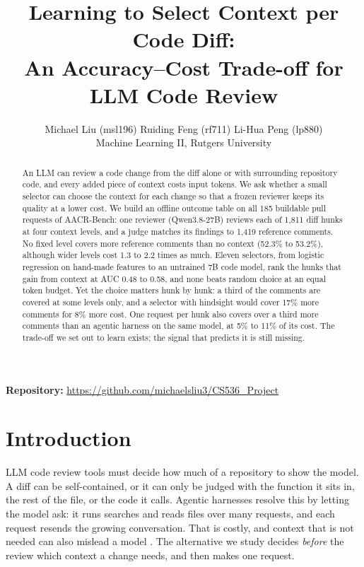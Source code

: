 \documentclass{article}
\title{Learning to Select Context per Code Diff:\\An Accuracy--Cost Trade-off for LLM Code Review}
\author{Michael Liu (msl196) \quad Ruiding Feng (rf711) \quad Li-Hua Peng (lp880)\\
Machine Learning II, Rutgers University}
\begin{document}
\nolinenumbers
\maketitle
\thispagestyle{plain}
\begin{abstract}
An LLM can review a code change from the diff alone or with surrounding repository code, and every added piece of context costs input tokens. We ask whether a small selector can choose the context for each change so that a frozen reviewer keeps its quality at a lower cost. We build an offline outcome table on all 185 buildable pull requests of AACR-Bench: one reviewer (Qwen3.8-27B) reviews each of 1,811 diff hunks at four context levels, and a judge matches its findings to 1,419 reference comments. No fixed level covers more reference comments than no context (52.3\% to 53.2\%), although wider levels cost 1.3 to 2.2 times as much. Eleven selectors, from logistic regression on hand-made features to an untrained 7B code model, rank the hunks that gain from context at AUC 0.48 to 0.58, and none beats random choice at an equal token budget. Yet the choice matters hunk by hunk: a third of the comments are covered at some levels only, and a selector with hindsight would cover 17\% more comments for 8\% more cost. One request per hunk also covers over a third more comments than an agentic harness on the same model, at 5\% to 11\% of its cost. The trade-off we set out to learn exists; the signal that predicts it is still missing.
\end{abstract}
\noindent\textbf{Repository:} \url{https://github.com/michaelsliu3/CS536_Project}

\section{Introduction}
LLM code review tools must decide how much of a repository to show the model. A diff can be self-contained, or it can only be judged with the function it sits in, the rest of the file, or the code it calls. Agentic harnesses resolve this by letting the model ask: it runs searches and reads files over many requests, and each request resends the growing conversation. That is costly, and context that is not needed can also mislead a model \citep{shi2023distracted}. The alternative we study decides \emph{before} the review which context a change needs, and then makes one request.
\end{document}

